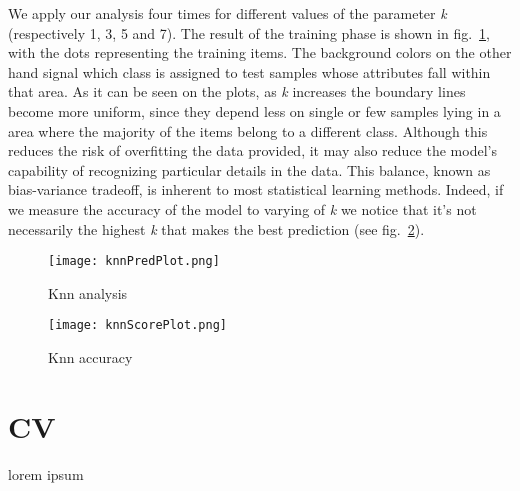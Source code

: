 \documentclass[11pt,twoside,a4paper]{article}
\begin{document}
We apply our analysis four times for different values of the parameter \emph{k} (respectively 1, 3, 5 and 7). The result of the training phase is shown in fig.~\ref{fig:knnPred}, with the dots representing the training items. The background colors on the other hand signal which class is assigned to test samples whose attributes fall within that area. As it can be seen on the plots, as \emph{k} increases the boundary lines become more uniform, since they depend less on single or few samples lying in a area where the majority of the items belong to a different class. Although this reduces the risk of overfitting the data provided, it may also reduce the model's capability of recognizing particular details in the data. %
This balance, known as bias-variance tradeoff, is inherent to most statistical learning methods. Indeed, if we measure the accuracy of the model to varying of \emph{k} we notice that it's not necessarily the highest \emph{k} that makes the best prediction (see fig.~\ref{fig:knnScore}).

\begin{figure}[]
  \begin{center}
  \texttt{[image: knnPredPlot.png]}
  \caption{Knn analysis}
  \label{fig:knnPred}
  \end{center}
\end{figure}

\begin{figure}[]
  \begin{center}
  \texttt{[image: knnScorePlot.png]}
  \caption{Knn accuracy}
  \label{fig:knnScore}
  \end{center}
\end{figure}

\section{CV}
\label{CV}
lorem ipsum
\end{document}
